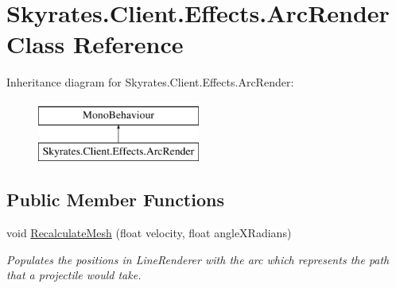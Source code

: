 \hypertarget{class_skyrates_1_1_client_1_1_effects_1_1_arc_render}{\section{Skyrates.\-Client.\-Effects.\-Arc\-Render Class Reference}
\label{class_skyrates_1_1_client_1_1_effects_1_1_arc_render}
}
Inheritance diagram for Skyrates.\-Client.\-Effects.\-Arc\-Render\-:\begin{figure}[H]
\begin{center}
\leavevmode
\includegraphics[height=2.000000cm]{class_skyrates_1_1_client_1_1_effects_1_1_arc_render}
\end{center}
\end{figure}
\subsection*{Public Member Functions}
\begin{DoxyCompactItemize}
\item 
void \hyperlink{class_skyrates_1_1_client_1_1_effects_1_1_arc_render_a6351923ebe40c21891b0acae38144e6f}{Recalculate\-Mesh} (float velocity, float angle\-X\-Radians)
\begin{DoxyCompactList}\small\item\em Populates the positions in Line\-Renderer with the arc which represents the path that a projectile would take. \end{DoxyCompactList}\end{DoxyCompactItemize}
